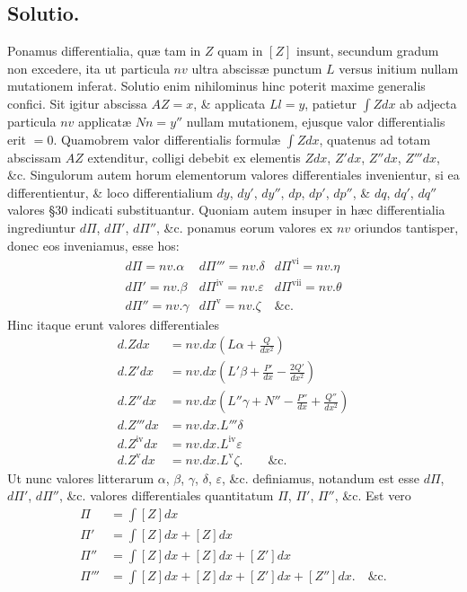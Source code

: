 \subsection*{Solutio.}
Ponamus differentialia, quæ tam in $Z$ quam in $[Z]$ insunt, secundum gradum non excedere, ita ut particula $nv$ ultra abscissæ punctum $L$ versus initium nullam mutationem inferat. Solutio enim nihilominus hinc poterit maxime generalis confici. Sit igitur abscissa $AZ=x$, \& applicata $Ll=y$, patietur $\int Zdx$ ab adjecta particula $nv$ applicatæ $Nn=y''$ nullam mutationem, ejusque valor differentialis erit $=0$. Quamobrem valor differentialis formulæ $\int Zdx$, quatenus ad totam abscissam $AZ$ extenditur, colligi debebit ex elementis $Zdx$, $Z'dx$, $Z''dx$, $Z'''dx$, \&c. Singulorum autem horum elementorum valores differentiales invenientur, si ea differentientur, \& loco differentialium $dy$, $dy'$, $dy''$, $dp$, $dp'$, $dp''$, \& $dq$, $dq'$, $dq''$ valores §30 indicati substituantur. Quoniam autem insuper in hæc differentialia ingrediuntur $d\Pi$, $d\Pi'$, $d\Pi''$, \&c. ponamus eorum valores ex $nv$ oriundos tantisper, donec eos inveniamus, esse hos:
\[
\begin{array}{lll}
d\Pi=nv.\alpha&d\Pi'''=nv.\delta&d\Pi^{\mathrm{vi}}=nv.\eta\\
d\Pi'=nv.\beta&d\Pi^{\mathrm{iv}}=nv.\varepsilon&d\Pi^{\mathrm{vii}}=nv.\theta\\
d\Pi''=nv.\gamma&d\Pi^{\mathrm{v}}=nv.\zeta&\text{\&c.}
\end{array}
\]
Hinc itaque erunt valores differentiales
\[
\begin{aligned}
d.Zdx&=nv.dx\left(L\alpha+\frac{Q}{dx^2}\right)\\
d.Z'dx&=nv.dx\left(L'\beta+\frac{P'}{dx}-\frac{2Q'}{dx^2}\right)\\
d.Z''dx&=nv.dx\left(L''\gamma+N''-\frac{P''}{dx}+\frac{Q''}{dx^2}\right)\\
d.Z'''dx&=nv.dx.L'''\delta\\
d.Z^{\mathrm{iv}}dx&=nv.dx.L^{\mathrm{iv}}\varepsilon\\
d.Z^{\mathrm{v}}dx&=nv.dx.L^{\mathrm{v}}\zeta.\qquad\text{\&c.}
\end{aligned}
\]
Ut nunc valores litterarum $\alpha$, $\beta$, $\gamma$, $\delta$, $\varepsilon$, \&c. definiamus, notandum est esse $d\Pi$, $d\Pi'$, $d\Pi''$, \&c. valores differentiales quantitatum $\Pi$, $\Pi'$, $\Pi''$, \&c. Est vero
\[
\begin{aligned}
\Pi&=\int[Z]dx\\
\Pi'&=\int[Z]dx+[Z]dx\\
\Pi''&=\int[Z]dx+[Z]dx+[Z']dx\\
\Pi'''&=\int[Z]dx+[Z]dx+[Z']dx+[Z'']dx.\quad\text{\&c.}
\end{aligned}
\]
